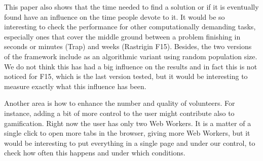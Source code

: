 \documentclass{sig-alternate}
\begin{document}
This paper also shows that the time needed to find a solution or if it
is eventually found have an influence on the time people devote to
it. It would be so interesting to check the performance for other computationally demanding
tasks, especially ones that cover the middle ground between a problem
finishing in seconds or minutes (Trap) and weeks (Rastrigin F15). 
Besides, the two versions of the framework include as an
algorithmic variant using random population size. We do not think this
has had a big influence on the results and in fact this is not noticed
for F15, which is the last version tested, but it would be interesting to
measure exactly what this influence has been. 

Another area is how to enhance the number and quality of
volunteers. For instance, adding a bit of more
control to the user might contribute also to gamification. Right now
the user has only two Web Workers. It is a matter of a single click to
open more tabs in the browser, giving more Web Workers, but it would be
interesting to put everything in a single page and under our control,
to check how often this happens and under which conditions. 


% 



\end{document}
